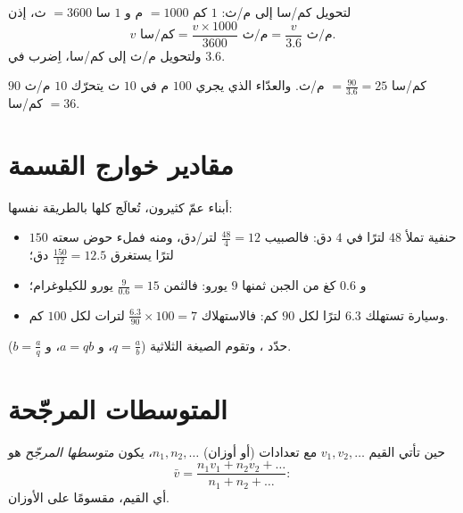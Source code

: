 \begin{method}\label{met:g8:speed:convert}
لتحويل كم/سا إلى م/ث: $1$ كم $= 1000$ م و $1$ سا $= 3600$ ث، إذن
\[
v \text{ كم/سا} = \frac{v \times 1000}{3600} \text{ م/ث}
= \frac{v}{3.6} \text{ م/ث}.
\]
ولتحويل م/ث إلى كم/سا، اِضرب في $3.6$.
\end{method}

\begin{example}\label{ex:g8:speed:convert}
$90$ كم/سا $= \frac{90}{3.6} = 25$ م/ث. والعدّاء الذي يجري $100$ م في
$10$ ث يتحرّك  $10$ م/ث $= 36$ كم/سا.
\end{example}

\section{مقادير خوارج القسمة}

\begin{example}\label{ex:g8:speed:quotients}
 أبناء عمّ كثيرون، تُعالَج كلها بالطريقة نفسها:
\begin{itemize}
  \item حنفية تملأ $48$ لترًا في $4$ دق: فالصبيب
        $\frac{48}{4} = 12$ لتر/دق، ومنه فملء حوض سعته $150$ لترًا يستغرق
        $\frac{150}{12} = 12.5$ دق؛
  \item و $0.6$ كغ من الجبن ثمنها $9$ يورو: فالثمن
        $\frac{9}{0.6} = 15$ يورو للكيلوغرام؛
  \item وسيارة تستهلك $6.3$ لترًا لكل $90$ كم: فالاستهلاك
        $\frac{6.3}{90} \times 100 = 7$ لترات لكل $100$ كم.
\end{itemize}
حدّد ، وتقوم الصيغة الثلاثية 
($q = \frac ab$، و $a = qb$، و $b = \frac aq$).
\end{example}

\section{المتوسطات المرجّحة}

\begin{definition}\label{def:g8:speed:average}
حين تأتي القيم $v_1, v_2, \dots$ مع تعدادات (أو أوزان)
$n_1, n_2, \dots$، يكون \emph{متوسطها المرجّح}
هو
\[
\bar v = \frac{n_1 v_1 + n_2 v_2 + \dots}{n_1 + n_2 + \dots} :
\]
أي  القيم، مقسومًا على  الأوزان.
\end{definition}

